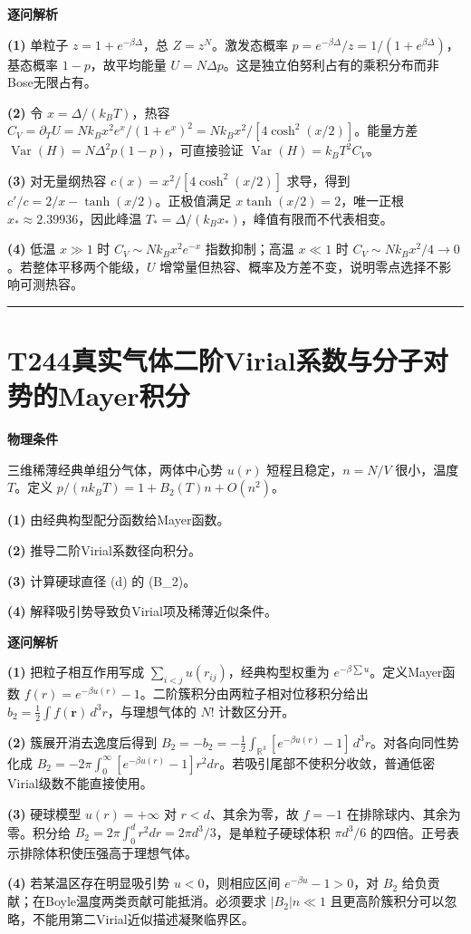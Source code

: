 \documentclass[UTF8,a4paper,11pt,oneside,openany]{ctexbook}
\begin{document}
\par\medskip\noindent\textbf{逐问解析}
\par\noindent\textbf{(1)} 单粒子 \(z=1+e^{-\beta\Delta}\)，总 \(Z=z^N\)。激发态概率 \(p=e^{-\beta\Delta}/z=1/(1+e^{\beta\Delta})\)，基态概率 \(1-p\)，故平均能量 \(U=N\Delta p\)。这是独立伯努利占有的乘积分布而非Bose无限占有。
\par\noindent\textbf{(2)} 令 \(x=\Delta/(k_BT)\)，热容 \(C_V=\partial_TU=Nk_Bx^2e^x/(1+e^x)^2=Nk_Bx^2/[4\cosh^2(x/2)]\)。能量方差 \(\operatorname{Var}(H)=N\Delta^2p(1-p)\)，可直接验证 \(\operatorname{Var}(H)=k_BT^2C_V\)。
\par\noindent\textbf{(3)} 对无量纲热容 \(c(x)=x^2/[4\cosh^2(x/2)]\) 求导，得到 \(c'/c=2/x-\tanh(x/2)\)。正极值满足 \(x\tanh(x/2)=2\)，唯一正根 \(x_*\approx2.39936\)，因此峰温 \(T_*=\Delta/(k_Bx_*)\)，峰值有限而不代表相变。
\par\noindent\textbf{(4)} 低温 \(x\gg1\) 时 \(C_V\sim Nk_Bx^2e^{-x}\) 指数抑制；高温 \(x\ll1\) 时 \(C_V\sim Nk_Bx^2/4\to0\)。若整体平移两个能级，\(U\) 增常量但热容、概率及方差不变，说明零点选择不影响可测热容。

\par\bigskip\hrule\bigskip
\section*{T244\quad 真实气体二阶Virial系数与分子对势的Mayer积分}
\textbf{物理条件}\par 三维稀薄经典单组分气体，两体中心势 \(u(r)\) 短程且稳定，\(n=N/V\) 很小，温度 \(T\)。定义 \(p/(nk_BT)=1+B_2(T)n+O(n^2)\)。
\par\noindent\textbf{(1)} 由经典构型配分函数给Mayer函数。
\par\noindent\textbf{(2)} 推导二阶Virial系数径向积分。
\par\noindent\textbf{(3)} 计算硬球直径 (d) 的 (B\_2)。
\par\noindent\textbf{(4)} 解释吸引势导致负Virial项及稀薄近似条件。

\par\medskip\noindent\textbf{逐问解析}
\par\noindent\textbf{(1)} 把粒子相互作用写成 \(\sum_{i<j}u(r_{ij})\)，经典构型权重为 \(e^{-\beta\sum u}\)。定义Mayer函数 \(f(r)=e^{-\beta u(r)}-1\)。二阶簇积分由两粒子相对位移积分给出 \(b_2=\frac12\int f(\boldsymbol r)\,d^3r\)，与理想气体的 \(N!\) 计数区分开。
\par\noindent\textbf{(2)} 簇展开消去逸度后得到 \(B_2=-b_2=-\frac12\int_{\mathbb R^3}[e^{-\beta u(r)}-1]\,d^3r\)。对各向同性势化成 \(B_2=-2\pi\int_0^\infty[e^{-\beta u(r)}-1]r^2dr\)。若吸引尾部不使积分收敛，普通低密Virial级数不能直接使用。
\par\noindent\textbf{(3)} 硬球模型 \(u(r)=+\infty\) 对 \(r<d\)、其余为零，故 \(f=-1\) 在排除球内、其余为零。积分给 \(B_2=2\pi\int_0^d r^2dr=2\pi d^3/3\)，是单粒子硬球体积 \(\pi d^3/6\) 的四倍。正号表示排除体积使压强高于理想气体。
\par\noindent\textbf{(4)} 若某温区存在明显吸引势 \(u<0\)，则相应区间 \(e^{-\beta u}-1>0\)，对 \(B_2\) 给负贡献；在Boyle温度两类贡献可能抵消。必须要求 \(|B_2|n\ll1\) 且更高阶簇积分可以忽略，不能用第二Virial近似描述凝聚临界区。
\end{document}
